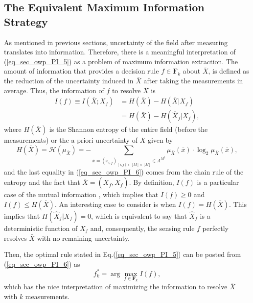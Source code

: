 \subsection{The Equivalent Maximum Information Strategy}
\label{sub_sec_owp_PI_max_info}
As mentioned in previous sections, uncertainty of the field after measuring translates into information.  Therefore, there is a meaningful interpretation of (\ref{eq_sec_owp_PI_5}) as a problem of maximum information extraction. The amount of information that provides a decision rule $f \in \mathbf{F}_k$ about $\bar{X}$, is defined as the reduction of the uncertainty induced in $\bar{X}$ after taking the measurements in average. Thus, the information of $f$ to resolve $\bar{X}$ is %
\begin{align}\label{eq_sec_owp_PI_6}
	I(f) \equiv I(\bar{X}; X_f)&=  H(\bar{X}) - H(\bar{X} | {X}_f) \nonumber\\
	     &= H(\bar{X}) - H(\hat{X}_f| {X}_f), 
\end{align} 
where $H(\bar{X})$ is the Shannon entropy of the entire field (before the measurements) or the a priori uncertainty of $\bar{X}$ given by
\begin{equation}\label{eq_sec_owp_PI_7}
	H(\bar{X})  = \mathcal{H}(\mu_{\bar{X}}) = -  \sum_{\bar{x}=(x_{i,j})_{(i,j)\in [M]\times [M]}  \in
	A^{M^2}} \mu_{\bar{X}} (\bar{x}) \cdot \log_2 \mu_{\bar{X}} (\bar{x}), 
\end{equation} 
and the last equality in (\ref{eq_sec_owp_PI_6}) comes from the chain rule of the entropy \citep{cover_2006}  
and the fact that $\bar{X}=({X}_f,\hat{X}_f)$.
By definition, $I(f)$ is a particular case of the mutual information \citep{cover_2006}, which implies that $I(f)\geq 0$ and $I(f) \leq H(\bar{X})$. {An interesting case to consider is when $I(f) = H(\bar{X})$. This implies that $H(\hat{X}_f| {X}_f)=0$, which is equivalent to say that $\hat{X}_f$ is a deterministic function of  ${X}_f$ \citep{cover_2006} and, consequently,  the sensing rule $f$ perfectly resolves $\bar{X}$ with no remaining uncertainty.}

Then, the optimal rule stated in Eq.(\ref{eq_sec_owp_PI_5}) can be posted from (\ref{eq_sec_owp_PI_6}) as
\begin{equation}\label{eq_sec_owp_PI_8}
	f^*_k = \arg \max_{f\in \mathbf{F}_k} 	I(f), 
\end{equation}
which has the nice interpretation of maximizing the information to resolve $\bar{X}$ with $k$ measurements.

